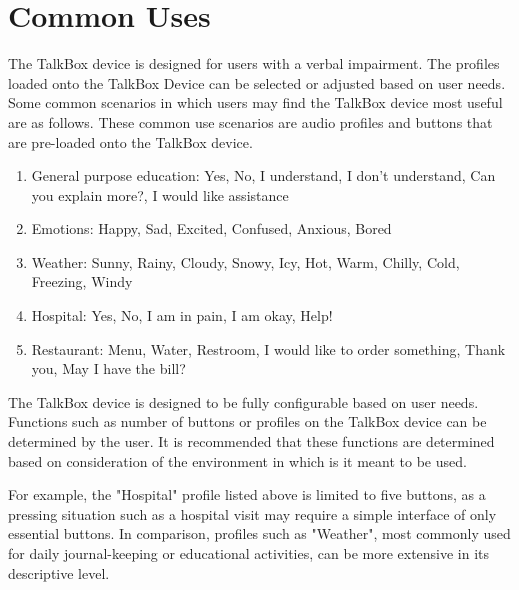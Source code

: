 \section{Common Uses}

The TalkBox device is designed for users with a verbal impairment. The profiles loaded onto the TalkBox Device can be selected or adjusted based on user needs. Some common scenarios in which users may find the TalkBox device most useful are as follows. These common use scenarios are audio profiles and buttons that are pre-loaded onto the TalkBox device. 

\begin{enumerate}
\end{enumerate}
\begin{enumerate}
\item General purpose education: Yes, No, I understand, I don't understand, Can you explain more?, I would like assistance
\item Emotions: Happy, Sad, Excited, Confused, Anxious, Bored
\item Weather: Sunny, Rainy, Cloudy, Snowy, Icy, Hot, Warm, Chilly, Cold, Freezing, Windy
\item Hospital: Yes, No, I am in pain, I am okay, Help!
\item Restaurant: Menu, Water, Restroom, I would like to order something, Thank you, May I have the bill?
\end{enumerate}
\medskip

The TalkBox device is designed to be fully configurable based on user needs. Functions such as number of buttons or profiles on the TalkBox device can be determined by the user. It is recommended that these functions are determined based on consideration of the environment in which is it meant to be used. 
\newline 

For example, the "Hospital" profile listed above is limited to five  buttons, as a pressing situation such as a hospital visit may require a simple interface of only essential buttons. In comparison, profiles such as "Weather", most commonly used for daily journal-keeping or educational activities, can be more extensive in its descriptive level. 

